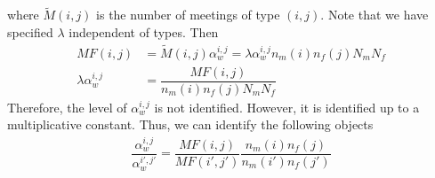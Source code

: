 where $\tilde M(i,j)$ is the number of meetings of type $(i,j)$. Note that we have specified $\lambda$ independent of types. Then 
\begin{align*}
MF(i,j) &= \tilde M(i,j) \alpha_w^{i,j}= \lambda  \alpha_w^{i,j} n_m(i)n_f(j) N_m N_f \\
\lambda  \alpha_w^{i,j} &= \dfrac{MF(i,j)}{n_m(i)n_f(j) N_m N_f}
\end{align*}
Therefore, the level of $\alpha_{w}^{i,j}$ is not identified. However, it is identified up to a multiplicative constant. Thus, we can identify the following objects 
\begin{align*}
\dfrac{ \alpha_w^{i,j}}{ \alpha_w^{i',j'}} = \dfrac{MF(i,j)}{MF(i',j')} \dfrac{n_m(i)n_f(j) }{n_m(i')n_f(j')}
\end{align*}

\begin{comment}

\section{Reduced form equations}
The structural model delineated above gives the following policy functions that can be used as reduced form equations in a nonlinear VAR estimation. In this section,  we focus on married couples and try to non parametrically estimate a nonlinear VAR system which explains the household consumption, each spouses' hours, assets, and decision to divorce as follows 
\begin{align*}
c_{m,t} &= c_{m,t}(A_{t}, w_{m,t}, w_{f,t}, \zeta_t) \\
c_{f,t} &= c_{f,t}(A_{t}, w_{m,t}, w_{f,t}, \zeta_t)\\
h_{m,t} &=  h_{m,t}(A_{t}, w_{m,t}, w_{f,t}, \zeta_t) \\
h_{f,t} &= h_{f,t}(A_{t}, w_{m,t}, w_{f,t}, \zeta_t) \\
A_{t} &=  A_{t}(A_{t-1}, w_{m,t-1}, w_{f,t-1}, \zeta_t) \\
D_{d,t} &= D_{d,t} (A_{t}, w_{m,t}, w_{f,t}, \zeta_{t})
\end{align*}
Since in PSID we do not observe the private consumption of spouses, we can only conned the household consumption
\begin{align*}
c_{t} = c_{m,t}(A_{t}, w_{m,t}, w_{f,t}, \zeta_t) + c_{f,t}(A_{t}, w_{m,t}, w_{f,t}, \zeta_t) = c_t(A_{t}, w_{m,t}, w_{f,t}, \zeta_t)
\end{align*}
Given the budget constraints, the reduced form equation for assets can also be considered as follows 
\begin{align*}
A_{t} &=  A_{t}(A_{t-1}, w_{m,t-1}, w_{f,t-1}, c_{t-1}, h_{m,t-1}, h_{f,t-1}) 
\end{align*}
The wage process for a marriage of type $(i,j)$ with identity $k$ at time $t$ is a first order Markov process  
\begin{align*}
W_{k,t}^{i,j} &= Q^{i,j}(W_{k, t-1}^{i,j}, U_{k,t}) \\
W_{k,t}^{i,j}  &= (\ln w_{k,m,t}^i, \ln w_{k,f,t}^j)'
\end{align*}
where $U_{k,t}$ are independent of $W^{t-1}_k$, and independent over time. 

\end{comment}
